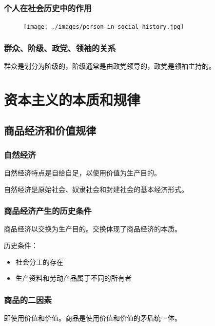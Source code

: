 \documentclass[12pt, a4paper, oneside]{ctexart}
\begin{document}
\subsubsection{个人在社会历史中的作用}

\begin{figure}[h]
  \centering
  \texttt{[image: ./images/person-in-social-history.jpg]}
\end{figure}

\subsubsection{群众、阶级、政党、领袖的关系}

群众是划分为阶级的，阶级通常是由政党领导的，政党是领袖主持的。

\section{资本主义的本质和规律}

\subsection{商品经济和价值规律}

\subsubsection{自然经济}

自然经济特点是自给自足，以使用价值为生产目的。

自然经济是原始社会、奴隶社会和封建社会的基本经济形式。

\subsubsection{商品经济产生的历史条件}

商品经济以交换为生产目的。交换体现了商品经济的本质。

历史条件：
\begin{itemize}
  \item 社会分工的存在
  \item 生产资料和劳动产品属于不同的所有者
\end{itemize}

\subsubsection{商品的二因素}

即使用价值和价值。商品是使用价值和价值的矛盾统一体。
\end{document}
